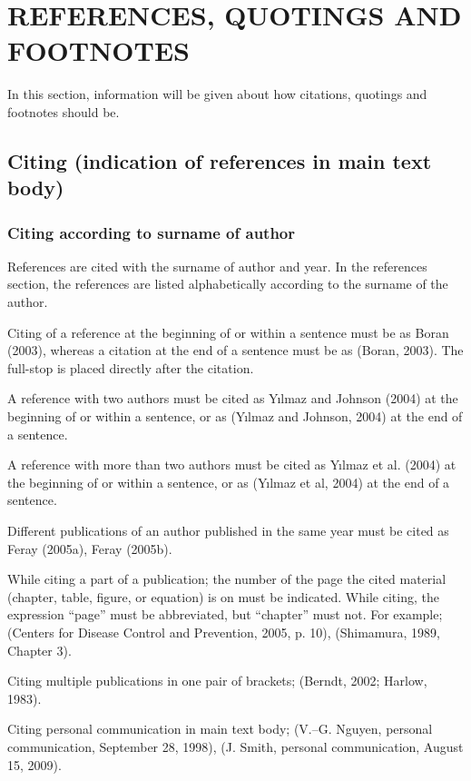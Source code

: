 \chapter{REFERENCES, QUOTINGS AND FOOTNOTES}\label{Ch4}

In this section, information will be given about how citations, quotings and footnotes should be.

\section{Citing (indication of references in main text body)}

\subsection{Citing according to surname of author}

References are cited with the surname of author and year. In the references section, the references are listed alphabetically according to the surname of the author.

Citing of a reference at the beginning of or within a sentence must be as Boran (2003), whereas a citation at the end of a sentence must be as (Boran, 2003). The full-stop is placed directly after the citation.
 
A reference with two authors must be cited as Yılmaz and Johnson (2004) at the beginning of or within a sentence, or as (Yılmaz and Johnson, 2004) at the end of a sentence. 

A reference with more than two authors must be cited as Yılmaz et al. (2004) at the beginning of or within a sentence, or as (Yılmaz et al, 2004) at the end of a sentence. 

Different publications of an author published in the same year must be cited as Feray (2005a), Feray (2005b). 

While citing a part of a publication; the number of the page the cited material (chapter, table, figure, or equation) is on must be indicated. While citing, the expression “page” must be abbreviated, but “chapter” must not. For example; (Centers for Disease Control and Prevention, 2005, p. 10), (Shimamura, 1989, Chapter 3). 

Citing multiple publications in one pair of brackets; (Berndt, 2002; Harlow, 1983). 

Citing personal communication in main text body; (V.–G. Nguyen, personal communication, September 28, 1998), (J. Smith, personal communication, August 15, 2009).


